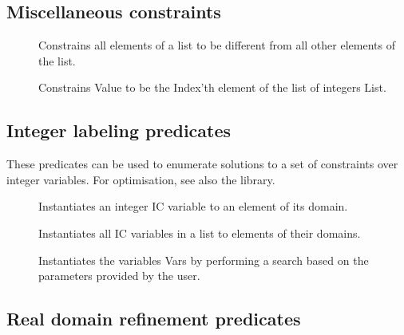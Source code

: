 \subsection{Miscellaneous constraints}

\begin{description}

\item
[]
Constrains all elements of a list to be different from all other
elements of the list.

\item
[]
Constrains Value to be the Index'th element of the list of integers List.

\end{description}


\subsection{Integer labeling predicates}

These predicates can be used to enumerate solutions to a set of constraints
over integer variables.  For optimisation, see also the
 library.

\begin{description}

\item []
Instantiates an integer IC variable to an element of its domain.

\item []
Instantiates all IC variables in a list to elements of their domains.

\item []
Instantiates the variables Vars by performing a search based on the
parameters provided by the user.

\end{description}


\subsection{Real domain refinement predicates}

